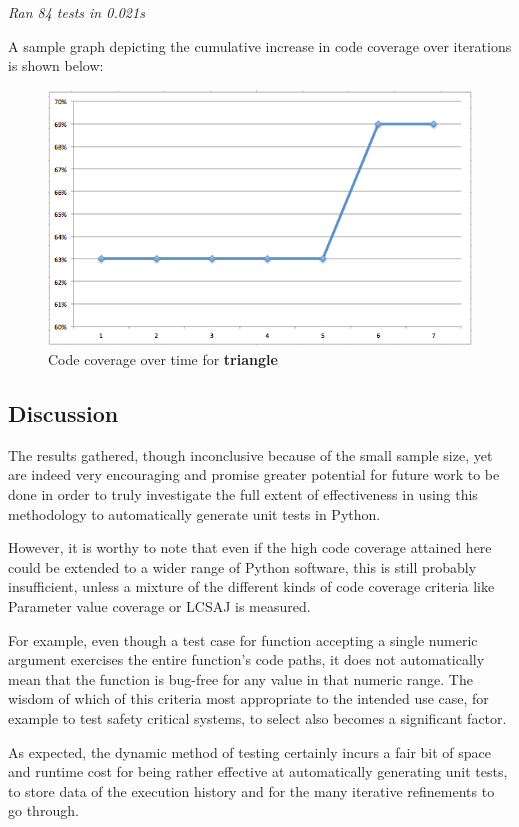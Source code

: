 \documentclass{icldt}
\numberwithin{equation}{section}       %
\begin{document}
{{\emph{Ran 84 tests in 0.021s}

A sample graph depicting the cumulative increase in code coverage over iterations is shown below:
\begin{figure}[H]
	\centering
	\includegraphics[scale=.7]{img/cot-triangle.png}
	\caption{Code coverage over time for \textbf{triangle}}
	\label{fig:cot-triangle}
\end{figure}

\subsection{Discussion}

The results gathered, though inconclusive because of the small sample size, yet are indeed very encouraging and promise greater potential for future work to be done in order to truly investigate the full extent of effectiveness in using this methodology to automatically generate unit tests in Python.

However, it is worthy to note that even if the high code coverage attained here could be extended to a wider range of Python software, this is still probably insufficient, unless a mixture of the different kinds of code coverage criteria like Parameter value coverage or LCSAJ is measured.

For example, even though a test case for function accepting a single numeric argument exercises the entire function's code paths, it does not automatically mean that the function is bug-free for any value in that numeric range. The wisdom of which of this criteria most appropriate to the intended use case, for example to test safety critical systems, to select also becomes a significant factor. 

As expected, the dynamic method of testing certainly incurs a fair bit of space and runtime cost for being rather effective at automatically generating unit tests, to store data of the execution history and for the many iterative refinements to go through.

}}
\end{document}
